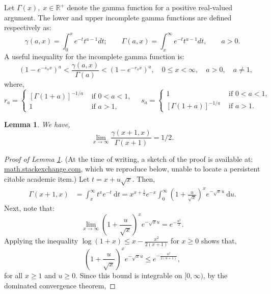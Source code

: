 \documentclass[ejs,noshowframe]{imsart}
\theoremstyle{plain}
\newtheorem{lemma}[theorem]{Lemma}
\theoremstyle{definition}
\theoremstyle{remark}
\begin{document}
\begin{appendix}
Let $\Gamma(x),\; x\in \mathbb{R}^{+}$ denote the gamma function for a positive real-valued argument. The lower and upper incomplete gamma functions are defined respectively as:
$$
\gamma(a, x)=\int_0^x e^{-t} t^{a-1} dt; \qquad  \Gamma(a, x)=\int_x^{\infty} e^{-t} t^{a-1} dt, \qquad a>0.
$$
A useful inequality \citep{alzer1997some,gautschi1998incomplete} for the incomplete gamma function is:
\begin{equation}  \label{incomplete gamma inequality}
\quad\left(1-e^{-s_a x}\right)^a<\frac{\gamma(a, x)}{\Gamma(a)}<\left(1-e^{-r_a x}\right)^a, \quad 0 \leq x<\infty, \quad a>0, \quad a \neq 1,
\end{equation}
where,
$$
r_a=\left\{\begin{array}{ll}
{[\Gamma(1+a)]^{-1 / a}} & \text { if } 0<a<1, \\
1 & \text { if } a>1,
\end{array} \quad s_a= \begin{cases}1 & \text { if } 0<a<1, \\
{[\Gamma(1+a)]^{-1 / a}} & \text { if } a>1.\end{cases}\right.
$$
\begin{lemma}  \label{incomplete asymp}
We have,
\begin{equation}
\lim_{x\to\infty}\frac{\gamma(x+1, x)}{\Gamma(x+1)} = 1/2. \label{incomplete gamma go to 1}
\end{equation}
\end{lemma}
\begin{proof}[Proof of Lemma \ref{incomplete asymp}]
(At the time of writing, a sketch of the proof is available at: \href{https://math.stackexchange.com/questions/3751528/limits-of-the-incomplete-gamma-function}{math.stackexchange.com}, which we reproduce below, unable to locate a persistent citable academic item.)  Let $t=x+u \sqrt{x}$. Then,
\begin{align}
\Gamma(x+1, x) &=\int_x^{\infty} t^x e^{-t} \mathrm{~d} t 
=x^{x+\frac{1}{2}} e^{-x} \int_0^{\infty}\left(1+\frac{u}{\sqrt{x}}\right)^x e^{-\sqrt{x} u} \mathrm{~d} u.\label{eq:gam1}
\end{align}
Next, note that:
$$
\lim _{x \rightarrow \infty}\left(1+\frac{u}{\sqrt{x}}\right)^x e^{-\sqrt{x} u}=e^{-\frac{u^2}{2}}.
$$
Applying  the  inequality $\log (1+x) \leq x-\frac{x^2}{2(x+1)}$ for $x \geq 0$ shows that, 
$$
\left(1+\frac{u}{\sqrt{x}}\right)^x e^{-\sqrt{x} u} \leq e^{-\frac{u^2}{2(u+1)}},
$$
for all $x \geq 1$ and $u \geq 0$. Since this bound is integrable on $[0, \infty)$,  by the dominated convergence theorem, 

\end{proof}
\end{appendix}
\end{document}
